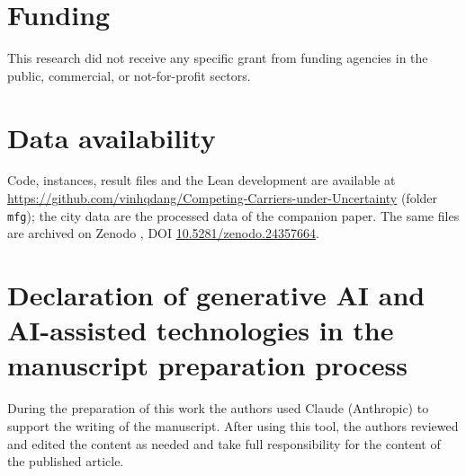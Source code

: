 \documentclass[preprint,11pt,authoryear]{elsarticle}
\theoremstyle{plain}
\theoremstyle{remark}
\begin{document}
\section*{Funding}
This research did not receive any specific grant from funding agencies in the public, commercial, or not-for-profit sectors.

\section*{Data availability}
Code, instances, result files and the Lean development are available at \url{https://github.com/vinhqdang/Competing-Carriers-under-Uncertainty} (folder \texttt{mfg}); the city data are the processed data of the companion paper. The same files are archived on Zenodo \citep{Zenodo2026}, DOI \href{https://doi.org/10.5281/zenodo.24357664}{10.5281/zenodo.24357664}.

\section*{Declaration of generative AI and AI-assisted technologies in the manuscript preparation process}
During the preparation of this work the authors used Claude (Anthropic) to support the writing of the manuscript. After using this tool, the authors reviewed and edited the content as needed and take full responsibility for the content of the published article.


\renewcommand{\bibfont}{\small}\setlength{\bibsep}{0pt plus 0.3pt}

\end{document}
